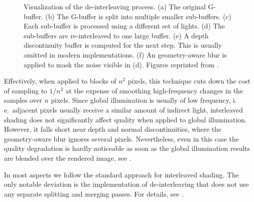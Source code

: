 \begin{figure}[htb]
\begin{subfigure}[b]{0.33\textwidth}
    \caption{\label{fig:concept:interleaved_segovia_6}}
  \end{subfigure}
  \caption{Visualization of the de-interleaving process. (a) The original G-buffer. (b) The G-buffer is split into multiple smaller sub-buffers. (c) Each sub-buffer is processed using a different set of lights. (d) The sub-buffers are re-interleaved to one large buffer. (e) A depth discontinuity buffer is computed for the next step. This is usually omitted in modern implementations. (f) An geometry-aware blur is applied to mask the noise visible in (d). Figures reprinted from \citet{segovia2006non}.}
  \label{fig:concept:interleaved_segovia}
\end{figure}


Effectively, when applied to blocks of $n^2$ pixels, this technique cuts down the cost of sampling to $ 1 / n^2 $ at the expense of smoothing high-frequency changes in the samples over $n$ pixels. Since global illumination is usually of low frequency, i.\,e.\ adjacent pixels usually receive a similar amount of indirect light, interleaved shading does not significantly affect quality when applied to global illumination. However, it falls short near depth and normal discontinuities, where the geometry-aware blur ignores several pixels. Nevertheless, even in this case the quality degradation is hardly noticeable as soon as the global illumination results are blended over the rendered image, see .

In most aspects we follow the standard approach for interleaved shading. The only notable deviation is the implementation of de-interleaving that does not use any separate splitting and merging passes. For details, see .
